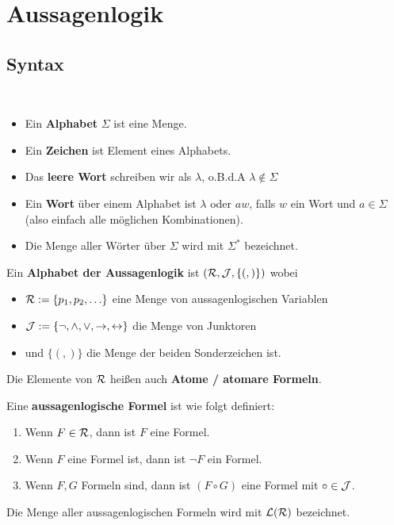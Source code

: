 
\chapter{Aussagenlogik}
\section{Syntax}

\begin{definition}\
	\begin{itemize}
		\item Ein \textbf{Alphabet} $\Sigma$ ist eine Menge.
		\item Ein \textbf{Zeichen} ist Element eines Alphabets.
		\item Das \textbf{leere Wort} schreiben wir als $\lambda$, o.B.d.A $\lambda\not\in\Sigma$
		\item Ein \textbf{Wort} über einem Alphabet ist $\lambda$ oder $aw$, falls $w$ ein Wort und $a\in\Sigma$ (also einfach alle möglichen Kombinationen).
		\item Die Menge aller Wörter über $\Sigma$ wird mit $\Sigma^\ast$ bezeichnet.
	\end{itemize}
\end{definition}

\begin{definition}
	Ein \textbf{Alphabet der Aussagenlogik} ist $(\mathcal{R},\mathcal{J},\lbrace(,)\rbrace)$ wobei
	\begin{itemize}
		\item $\mathcal{R}:=\lbrace p_1,p_2,\ldots\rbrace$ eine Menge von aussagenlogischen Variablen
		\item $\mathcal{J}:=\lbrace\neg,\wedge,\vee,\to,\leftrightarrow\rbrace$ die Menge von Junktoren
		\item und $\lbrace(,)\rbrace$ die Menge der beiden Sonderzeichen ist.
	\end{itemize}
	Die Elemente von $\mathcal{R}$ heißen auch \textbf{Atome / atomare Formeln}.
\end{definition}

\begin{definition}\label{def3.5Formel}
	Eine \textbf{aussagenlogische Formel} ist wie folgt definiert:
	\begin{enumerate}
		\item Wenn $F\in\mathcal{R}$, dann ist $F$ eine Formel.
		\item Wenn $F$ eine Formel ist, dann ist $\neg F$ ein Formel.
		\item Wenn $F,G$ Formeln sind, dann ist $(F\circ G)$ eine Formel mit $\circ\in\mathcal{J}$.
	\end{enumerate}
	Die Menge aller aussagenlogischen Formeln wird mit $\mathcal{L}(\mathcal{R})$ bezeichnet.
\end{definition}

